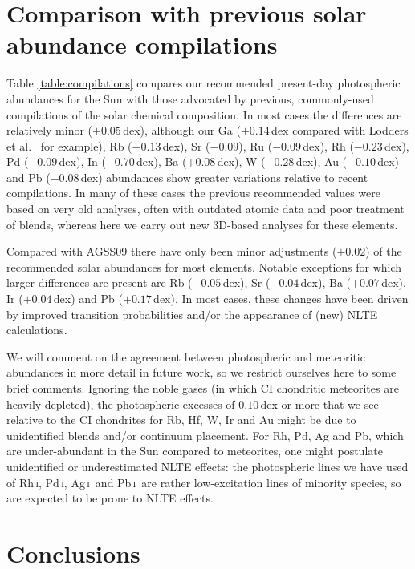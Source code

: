 \documentclass[traditabstract]{aa}
\newcommand{\altrhi}{Rh\,\textsc{i}}
\newcommand{\altpdi}{Pd\,\textsc{i}}
\newcommand{\altagi}{Ag\,\textsc{i}}
\newcommand{\altpbi}{Pb\,\textsc{i}}
\newcommand{\agi}{\altagi\ }
\newcommand{\pbi}{\altpbi\ }
\begin{document}
\section{Comparison with previous solar abundance compilations}
\label{compilations}

Table \ref{table:compilations} compares our recommended present-day photospheric abundances for the Sun with those advocated by previous, commonly-used compilations of the solar chemical composition. In most cases the differences are relatively minor ($\pm 0.05$\,dex), although our Ga ($+0.14$\,dex compared with Lodders et al.\ \cite{lodd} for example), Rb ($-0.13$\,dex), Sr ($-0.09$), Ru ($-0.09$\,dex), Rh ($-0.23$\,dex), Pd ($-0.09$\,dex),  In ($-0.70$\,dex), Ba ($+0.08$\,dex), W ($-0.28$\,dex), Au ($-0.10$\,dex) and Pb ($-0.08$\,dex) abundances show greater variations relative to recent compilations. In many of these cases the previous recommended values were based on very old analyses, often with outdated atomic data and poor treatment of blends, whereas here we carry out new 3D-based analyses for these elements. 

Compared with AGSS09 there have only been minor adjustments ($\pm 0.02$) of the recommended solar abundances for most elements. Notable exceptions for which larger differences are present are Rb ($-0.05$\,dex), Sr ($-0.04$\,dex), Ba  ($+0.07$\,dex), Ir ($+0.04$\,dex) and Pb ($+0.17$\,dex). In most cases, these changes have been driven by improved transition probabilities and/or the appearance of (new) NLTE calculations.  

We will comment on the agreement between photospheric and meteoritic abundances in more detail in future work, so we restrict ourselves here to some brief comments.  Ignoring the noble gases (in which CI chondritic meteorites are heavily depleted), the photospheric excesses of $0.10$\,dex or more that we see relative to the CI chondrites for Rb, Hf, W, Ir and Au might be due to unidentified blends and/or continuum placement.  For Rh, Pd, Ag and Pb, which are under-abundant in the Sun compared to meteorites, one might postulate unidentified or underestimated NLTE effects: the photospheric lines we have used of \altrhi, \altpdi, \agi and \pbi are rather low-excitation lines of minority species, so are expected to be prone to NLTE effects.


\section{Conclusions}
\label{conclusions}
\end{document}
